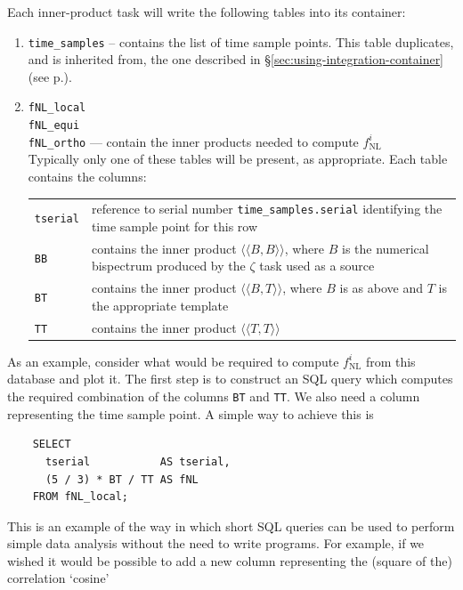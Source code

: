 \documentclass[11pt,a4paper]{article}
\newcommand{\fNL}{f_{\mathrm{NL}}}
\newcommand{\iprod}[2]{\langle\!\langle {#1}, {#2} \rangle\!\rangle}
\newenvironment{sqltablelist}{\renewcommand{\arraystretch}{1.3}\small}{}
\begin{document}
Each inner-product task will write the following tables
into its container:
\begin{sqltablelist}
\begin{enumerate}
    \item \texttt{time_samples} -- contains the list of time sample points.
	This table duplicates, and is inherited from, the one described in \S\ref{sec:using-integration-container}
	(see p.\pageref{sqltable:time-samples}).
	
	\item \texttt{fNL_local} \\
	\texttt{fNL_equi} \\
	\texttt{fNL_ortho} --- contain the inner products needed to compute $\fNL^i$ \\
	Typically only one of these tables will be present, as appropriate. Each table contains the columns: \\
	\begin{tabular}{p{2.5cm}p{11.5cm}}
	   \texttt{tserial} & reference to serial number \texttt{time_samples.serial}
	   identifying the time sample point for this row \\
	   \texttt{BB} & contains the inner product $\iprod{B}{B}$, where $B$ is the numerical
	   bispectrum produced by the $\zeta$ task used as a source \\
	   \texttt{BT} & contains the inner product $\iprod{B}{T}$, where $B$ is as above and
	   $T$ is the appropriate template \\
	   \texttt{TT} & contains the inner product $\iprod{T}{T}$ 
	\end{tabular}
\end{enumerate}
\end{sqltablelist}
As an example, consider what would be required to compute
$\fNL^i$ from this database and plot it.
The first step is to construct an SQL query which computes the
required combination
of the columns \texttt{BT}
and \texttt{TT}.
We also need a column representing the time sample point.
A simple way to achieve this is
\begin{verbatim}
    SELECT
      tserial           AS tserial,
      (5 / 3) * BT / TT AS fNL
    FROM fNL_local;
\end{verbatim}
This is an example of the way in which short SQL queries can be used
to perform simple data analysis without
the need to write programs.
For example, if we wished it would be possible to add
a new column representing the (square of the) correlation `cosine'
\end{document}
